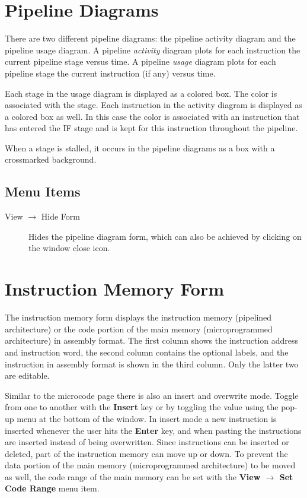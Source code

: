 \documentclass{article}
\begin{document}
\section{Pipeline Diagrams}
There are two different pipeline diagrams: the pipeline activity diagram and the pipeline usage diagram. A pipeline \emph{activity} diagram plots for each instruction the current pipeline stage versus time. A pipeline \emph{usage} diagram plots for each pipeline stage the current instruction (if any) versus time.

Each stage in the usage diagram is displayed as a colored box. The 
color is associated with the stage. Each instruction in the activity 
diagram is displayed as a colored box as well. In this case the color is
 associated with an instruction that has entered the IF stage and is 
kept for this instruction throughout the pipeline. 

When a stage is stalled, it occurs in the pipeline diagrams as a box with a crossmarked background.

\subsection{Menu Items}

\begin{description}
\item[View $\to$ Hide Form] Hides the pipeline diagram form, which can also be achieved by clicking on the window close icon. 
\end{description}

\section{Instruction Memory Form}

The instruction memory form displays the instruction memory (pipelined 
architecture) or the code portion of the main memory (microprogrammed 
architecture) in assembly format. The first column shows the instruction
 address and instruction word, the second column contains the optional 
labels, and the instruction in assembly format is shown in the third 
column. Only the latter two are editable.

Similar to the microcode page there is also an insert and overwrite mode. Toggle from one to another with the \textbf{Insert} key
or by toggling the value using the pop-up menu at the bottom of the window.
In insert mode a new instruction is inserted whenever the user hits the \textbf{Enter}
 key, and when pasting the instructions are inserted instead of being 
overwritten. Since instructions can be inserted or deleted, part of the 
instruction memory can move up or down. To prevent the data portion of 
the main memory (microprogrammed architecture) to be moved as well, the 
code range of the main memory can be set with the \textbf{View $\to$ Set Code Range} menu item. 
\end{document}
